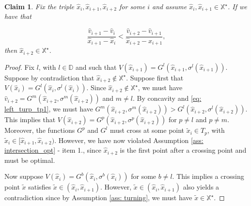 \documentclass[12pt]{article}
\newtheorem{claim}{Claim}
\newcommand{\DChSet}{\mathbb{D}}
\begin{document}
\begin{claim}\label{clm: increasing_g}
Fix the triple $\hat{x}_{i}, \hat{x}_{i+1}, \hat{x}_{i+2}$ for some $i$ and assume $\hat{x}_{i}, \hat{x}_{i+1}\in \mathbb{X}^{\star}$. If we have that

\begin{equation}\label{eq: left_turp_tp1}
    \frac{\hat{v}_{i+1}-\hat{v}_{i}}{\hat{x}_{i+1}- \hat{x}_{i}}< \frac{\hat{v}_{i+2}- \hat{v}_{i+1}}{\hat{x}_{i+2}- \hat{x}_{i+1}},
\end{equation}
%
then $\hat{x}_{i+2}\in \mathbb{X}^{\star}$.
\end{claim}

\begin{proof}
Fix $l$, with $l\in \DChSet$ and such that $V(\hat{x}_{i+1}) = G^{l}(\hat{x}_{i+1}, \sigma^{l}(\hat{x}_{i+1}))$. Suppose by contradiction that $\hat{x}_{i+2}\not\in \mathbb{X}^{\star}$. Suppose first that $V(\hat{x}_{i}) =  G^{l}(\hat{x}_{i}, \sigma^{l}(\hat{x}_{i}))$. Since $\hat{x}_{i+2}\not\in \mathbb{X}^{\star}$, we must have $\hat{v}_{i+2} =  G^{m}(\hat{x}_{i+2}, \sigma^{m}(\hat{x}_{i+2}))$ and $m\not = l$. By concavity and \eqref{eq: left_turp_tp1}, we must have $G^{m}(\hat{x}_{i+2}, \sigma^{m}(\hat{x}_{i+2}))> G^{l}(\hat{x}_{i+2}, \sigma^{l}(\hat{x}_{i+2}))$. This implies that $V(\hat{x}_{i+2}) = G^{p}(\hat{x}_{i+2}, \sigma^{p}(\hat{x}_{i+2}))$ for $p\not = l$ and $p\not = m$. Moreover, the functions $G^{p}$ and $G^{l}$ must cross at some point $\tilde{x}_{i}\in T_{p}$, with $\tilde{x}_{i} \in [\hat{x}_{i+1},\hat{x}_{i+2})$. However, we have now violated Assumption \ref{ass: intersection_opt} - item 1., since $\hat{x}_{i+2}$ is the first point after a crossing point and must be optimal. 

Now suppose $V(\hat{x}_{i}) =  G^{b}(\hat{x}_{i}, \sigma^{b}(\hat{x}_{i}))$ for some $b\not = l$. This implies a crossing point $\tilde{x}$ satisfies $\tilde{x}\in (\hat{x}_{i},\hat{x}_{i+1})$. However, $\tilde{x}\in (\hat{x}_{i},\hat{x}_{i+1})$ also yields a contradiction since by  Assumption \ref{ass: turning},  we must have $\tilde{x}\in \mathbb{X}^{\star}$. 
\end{proof}
\end{document}
